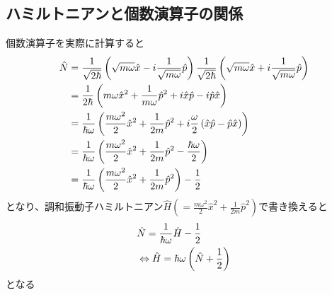 \documentclass{jsarticle}  %
\numberwithin{equation}{section} %
\numberwithin{figure}{section}
\begin{document}
\subsection{ハミルトニアンと個数演算子の関係}
    個数演算子を実際に計算すると
    \begin{align}
        \hat{N} &= \frac{1}{\sqrt{2\hbar}}\left( \sqrt{m\omega} \hat{x} -i \frac{1}{\sqrt{m\omega}} \hat{p}\right) \frac{1}{\sqrt{2\hbar}}\left( \sqrt{m\omega} \hat{x} +i \frac{1}{\sqrt{m\omega}} \hat{p}\right) \notag \\
        &= \frac{1}{2\hbar} \left( m\omega \hat{x}^2 + \frac{1}{m\omega}\hat{p}^2 + i\hat{x}\hat{p} -i\hat{p}\hat{x} \right) \notag \\
        &= \frac{1}{\hbar \omega} \left( \frac{m\omega^2}{2} \hat{x}^2 + \frac{1}{2m}\hat{p}^2 + i\frac{\omega}{2} \left(\hat{x}\hat{p} -\hat{p}\hat{x} \right) \right) \notag \\
        &= \frac{1}{\hbar \omega} \left( \frac{m\omega^2}{2} \hat{x}^2 + \frac{1}{2m}\hat{p}^2 - \frac{\hbar \omega}{2} \right) \notag \\
        &= \frac{1}{\hbar \omega} \left( \frac{m\omega^2}{2} \hat{x}^2 + \frac{1}{2m}\hat{p}^2 \right) - \frac{1}{2}
    \end{align}
    となり、調和振動子ハミルトニアン$\hat{H}(=\frac{m\omega^2}{2} \hat{x}^2 + \frac{1}{2m}\hat{p}^2 )$で書き換えると
    \begin{align}
        &\hat{N} = \frac{1}{\hbar \omega} \hat{H} - \frac{1}{2} \notag \\
        &\Leftrightarrow \hat{H} = \hbar \omega \left( \hat{N} + \frac{1}{2} \right)
    \end{align}
    となる
\end{document}
